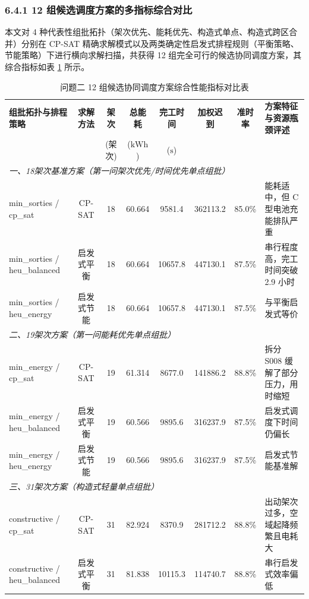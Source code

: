 \documentclass[withoutpreface,bwprint]{format}
\begin{document}
\subsubsection{6.4.1 12 组候选调度方案的多指标综合对比}
本文对 4 种代表性组批拓扑（架次优先、能耗优先、构造式单点、构造式跨区合并）分别在 CP-SAT 精确求解模式以及两类确定性启发式排程规则（平衡策略、节能策略）下进行横向求解扫描，共获得 12 组完全可行的候选协同调度方案，其综合指标如表 \ref{tab:candidates_comparison_q2} 所示。

\begin{table}[H]
\centering
\small
\caption{问题二 12 组候选协同调度方案综合性能指标对比表}
\label{tab:candidates_comparison_q2}
\begin{tabularx}{\textwidth}{l c c c c c c >{\raggedright\arraybackslash}X}
\toprule
\textbf{组批拓扑与排程策略} & \textbf{求解方法} & \textbf{架次} & \textbf{总能耗} & \textbf{完工时间} & \textbf{加权迟到} & \textbf{准时率} & \textbf{方案特征与资源瓶颈评述} \\
& & (架次) & ($\text{kWh}$) & ($\text{s}$) & & & \\
\midrule
\multicolumn{8}{l}{\textit{一、18架次基准方案（第一问架次优先/时间优先单点组批）}} \\
min\_sorties / cp\_sat & CP-SAT & 18 & 60.664 & 9581.4 & 362113.2 & 85.0\% & 能耗适中，但 C 型电池充能排队严重 \\
min\_sorties / heu\_balanced & 启发式平衡 & 18 & 60.664 & 10657.8 & 447130.1 & 87.5\% & 串行程度高，完工时间突破 2.9 小时 \\
min\_sorties / heu\_energy & 启发式节能 & 18 & 60.664 & 10657.8 & 447130.1 & 87.5\% & 与平衡启发式等价 \\
\midrule
\multicolumn{8}{l}{\textit{二、19架次方案（第一问能耗优先单点组批）}} \\
min\_energy / cp\_sat & CP-SAT & 19 & 61.314 & 8677.0 & 141886.2 & 88.8\% & 拆分 S008 缓解了部分压力，用时缩短 \\
min\_energy / heu\_balanced & 启发式平衡 & 19 & 60.566 & 9895.6 & 316237.9 & 87.5\% & 启发式调度下时间仍偏长 \\
min\_energy / heu\_energy & 启发式节能 & 19 & 60.566 & 9895.6 & 316237.9 & 87.5\% & 启发式节能基准解 \\
\midrule
\multicolumn{8}{l}{\textit{三、31架次方案（构造式轻量单点组批）}} \\
constructive / cp\_sat & CP-SAT & 31 & 82.924 & 8370.9 & 281712.2 & 88.8\% & 出动架次过多，空域起降频繁且电耗大 \\
constructive / heu\_balanced & 启发式平衡 & 31 & 81.838 & 10115.3 & 114740.7 & 88.8\% & 串行启发式效率偏低 \\

\end{tabularx}
\end{table}
\end{document}
